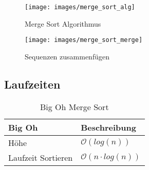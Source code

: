 \begin{figure}[h!]
	\centering
	\begin{minipage}[t]{0.4\textwidth}
		\centering
		\texttt{[image: images/merge\_sort\_alg]}
		\caption{Merge Sort Algorithmus}
		\label{fig:mergesortalg}
	\end{minipage}
	\begin{minipage}[t]{0.4\textwidth}
		\centering
		\texttt{[image: images/merge\_sort\_merge]}
		\caption{Sequenzen zusammenfügen}
		\label{fig:mergesortmergen}
	\end{minipage}
\end{figure}


\subsection{Laufzeiten}
\begin{table}[h]
	\centering
	\begin{tabu} to \linewidth {l l}
		\toprule
		Big Oh & Beschreibung \\
		\midrule
		Höhe & $\mathcal{O}(log (n))$ \\
		Laufzeit Sortieren & $\mathcal{O}(n \cdot log(n))$ \\
		\bottomrule
	\end{tabu}
	\caption{Big Oh Merge Sort}
\end{table}

\clearpage


